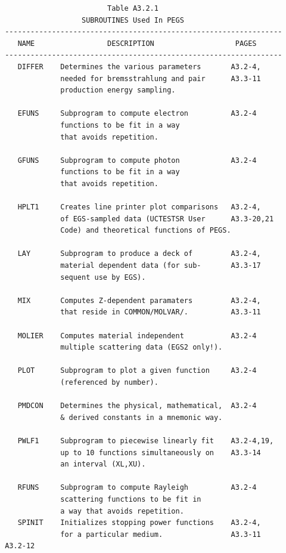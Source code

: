 \newpage {} \begin{verbatim}
                         Table A3.2.1
                   SUBROUTINES Used In PEGS
 -----------------------------------------------------------------
    NAME                 DESCRIPTION                   PAGES
 -----------------------------------------------------------------
    DIFFER    Determines the various parameters       A3.2-4,
              needed for bremsstrahlung and pair      A3.3-11
              production energy sampling.
 
    EFUNS     Subprogram to compute electron          A3.2-4
              functions to be fit in a way
              that avoids repetition.
 
    GFUNS     Subprogram to compute photon            A3.2-4
              functions to be fit in a way
              that avoids repetition.
 
    HPLT1     Creates line printer plot comparisons   A3.2-4,
              of EGS-sampled data (UCTESTSR User      A3.3-20,21
              Code) and theoretical functions of PEGS.
 
    LAY       Subprogram to produce a deck of         A3.2-4,
              material dependent data (for sub-       A3.3-17
              sequent use by EGS).
 
    MIX       Computes Z-dependent paramaters         A3.2-4,
              that reside in COMMON/MOLVAR/.          A3.3-11
 
    MOLIER    Computes material independent           A3.2-4
              multiple scattering data (EGS2 only!).
 
    PLOT      Subprogram to plot a given function     A3.2-4
              (referenced by number).
 
    PMDCON    Determines the physical, mathematical,  A3.2-4
              & derived constants in a mnemonic way.
 
    PWLF1     Subprogram to piecewise linearly fit    A3.2-4,19,
              up to 10 functions simultaneously on    A3.3-14
              an interval (XL,XU).
 
    RFUNS     Subprogram to compute Rayleigh          A3.2-4
              scattering functions to be fit in
              a way that avoids repetition.
    SPINIT    Initializes stopping power functions    A3.2-4,
              for a particular medium.                A3.3-11
 A3.2-12
\end{verbatim} 

